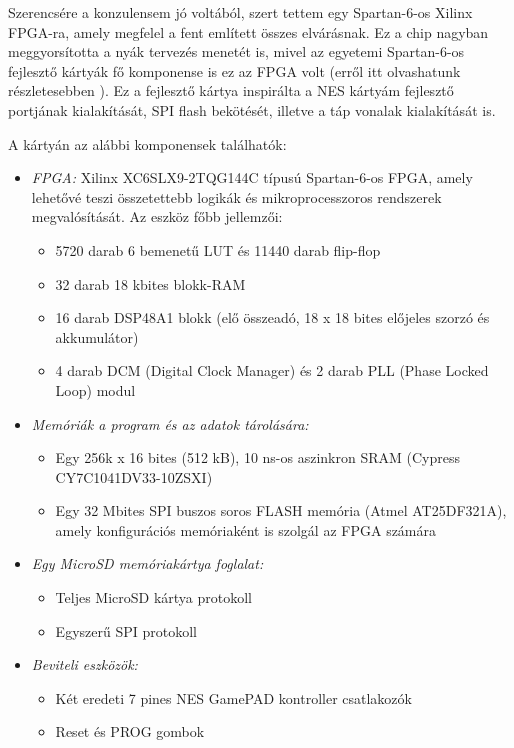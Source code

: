 Szerencsére a konzulensem jó voltából, szert tettem egy Spartan-6-os Xilinx FPGA-ra, amely megfelel a fent említett összes elvárásnak. Ez a chip nagyban meggyorsította a nyák tervezés menetét is, mivel az egyetemi Spartan-6-os fejlesztő kártyák fő komponense is ez az FPGA volt (erről itt olvashatunk részletesebben \cite{spatan6}). Ez a fejlesztő kártya inspirálta a NES kártyám fejlesztő portjának kialakítását, SPI flash bekötését, illetve a táp vonalak kialakítását is. 
	
A kártyán az alábbi komponensek találhatók:

\begin{itemize}
	\item \emph{FPGA:} Xilinx XC6SLX9-2TQG144C típusú Spartan-6-os FPGA, amely lehetővé teszi összetettebb logikák és
	mikroprocesszoros rendszerek megvalósítását. Az eszköz főbb jellemzői:
		\begin{itemize}
			\item 5720 darab 6 bemenetű LUT és 11440 darab flip-flop
			\item 32 darab 18 kbites blokk-RAM
			\item 16 darab DSP48A1 blokk (elő összeadó, 18 x 18 bites előjeles szorzó és akkumulátor)
			\item 4 darab DCM (Digital Clock Manager) és 2 darab PLL (Phase Locked Loop) modul
		\end{itemize} 
	\item \emph{Memóriák a program és az adatok tárolására:}
		\begin{itemize}
			\item Egy 256k x 16 bites (512 kB), 10 ns-os aszinkron SRAM (Cypress CY7C1041DV33-10ZSXI)
			\item Egy 32 Mbites SPI buszos soros FLASH memória (Atmel AT25DF321A), amely
			konfigurációs memóriaként is szolgál az FPGA számára
		\end{itemize}
	\item \emph{Egy MicroSD memóriakártya foglalat:}
		\begin{itemize}
			\item Teljes MicroSD kártya protokoll
			\item Egyszerű SPI protokoll
		\end{itemize}
	\item \emph{Beviteli eszközök:}
		\begin{itemize}
			\item Két eredeti 7 pines NES GamePAD kontroller csatlakozók
			\item Reset és PROG gombok

\end{itemize}
\end{itemize}
